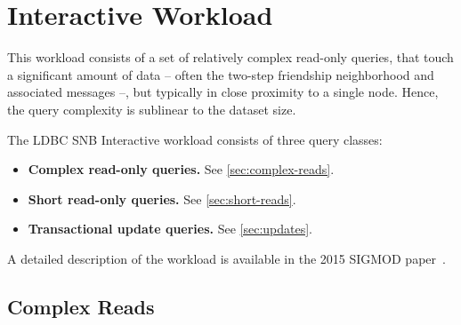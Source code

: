 \chapter{Interactive Workload}
\label{section:interactive}

This workload consists of a set of relatively complex read-only queries, that touch a significant
amount of data -- often the two-step friendship neighborhood and associated messages --, but typically in close proximity to a single node. Hence, the query complexity is sublinear to the dataset size.

The LDBC SNB Interactive workload consists of three query classes:

\begin{itemize}
\item \textbf{Complex read-only queries.} See \autoref{sec:complex-reads}.
\item \textbf{Short read-only queries.} See \autoref{sec:short-reads}.
\item \textbf{Transactional update queries.} See \autoref{sec:updates}.
\end{itemize}

A detailed description of the workload is available in the 2015 \mbox{SIGMOD} paper~\cite{DBLP:conf/sigmod/ErlingALCGPPB15}.


\section{Complex Reads}
\label{sec:complex-reads}
















